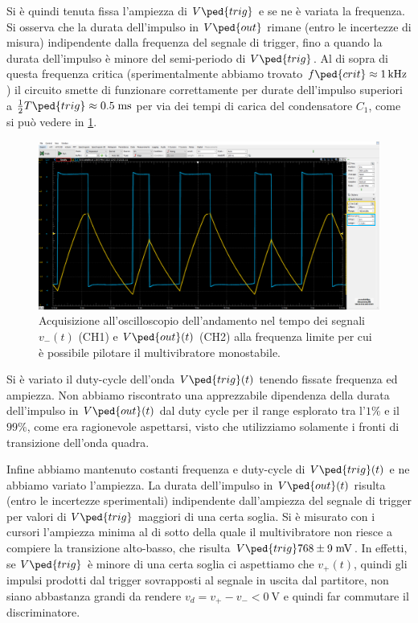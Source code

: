 \documentclass[10pt, a4paper, italian]{article}
\begin{document}
Si è quindi tenuta fissa l'ampiezza di $V\ped{trig}$ e se ne è variata la
frequenza. Si osserva che la durata dell'impulso in $V\ped{out}$ rimane
(entro le incertezze di misura) indipendente dalla frequenza del segnale di
trigger, fino a quando la durata dell'impulso è minore del semi-periodo di
$V\ped{trig}$. Al di sopra di questa frequenza critica (sperimentalmente
abbiamo trovato $f\ped{crit} \approx \SI{1}{k\hertz}$) il circuito smette di
funzionare correttamente per durate dell'impulso superiori a
$\frac{1}{2} T\ped{trig} \approx 0.5 \; \si{m\s}$ per via dei tempi di carica
del condensatore $C_1$, come si può vedere in \cref{fig: mstabileflim}.
\begin{figure}[htbp]
\centering
\includegraphics[scale=0.335]{mstable950hz}
\caption{Acquisizione all'oscilloscopio dell'andamento nel tempo dei
segnali $v_- (t)$ (CH1) e $V\ped{out} (t)$ (CH2) alla frequenza limite
per cui è possibile pilotare il multivibratore monostabile.
\label{fig: mstabileflim}}
\end{figure}

Si è variato il duty-cycle dell'onda $V\ped{trig} (t)$ tenendo fissate
frequenza ed ampiezza. Non abbiamo riscontrato una apprezzabile dipendenza
della durata dell'impulso in $V\ped{out} (t)$ dal duty cycle per il range
esplorato tra l'$1 \%$ e il $99 \%$, come era ragionevole aspettarsi, visto che
utilizziamo solamente i fronti di transizione dell'onda quadra.

Infine abbiamo mantenuto costanti frequenza e duty-cycle di $V\ped{trig} (t)$
e ne abbiamo variato l'ampiezza. La durata dell'impulso in $V\ped{out} (t)$
risulta (entro le incertezze sperimentali) indipendente dall'ampiezza del
segnale di trigger per valori di $V\ped{trig}$ maggiori di una certa soglia.
Si è misurato con i cursori l'ampiezza minima al di sotto della quale
il multivibratore non riesce a compiere la transizione alto-basso,
che risulta $V\ped{trig} 768 \pm 9 \; \si{m\V}$.
In effetti, se $V\ped{trig}$ è minore di una certa soglia ci aspettiamo
che $v_+ (t)$, quindi gli impulsi prodotti dal trigger sovrapposti al segnale
in uscita dal partitore, non siano abbastanza grandi da rendere
$v_d = v_+ - v_- < \SI{0}{\V}$ e quindi far commutare il discriminatore.
\end{document}
